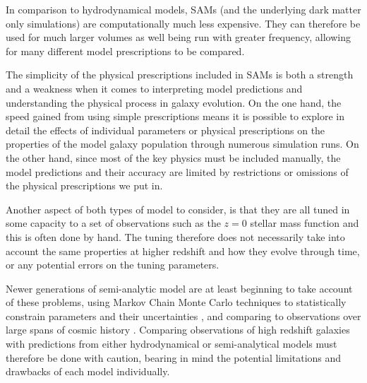 \begin{itemize}
		In comparison to hydrodynamical models, SAMs (and the underlying dark matter only simulations) are computationally much less expensive. They can therefore be used for much larger volumes as well being run with greater frequency, allowing for many different model prescriptions to be compared.
		
		The simplicity of the physical prescriptions included in SAMs is both a strength and a weakness when it comes to interpreting model predictions and understanding the physical process in galaxy evolution. On the one hand, the speed gained from using simple prescriptions means it is possible to explore in detail the effects of individual parameters or physical prescriptions on the properties of the model galaxy population through numerous simulation runs. On the other hand, since most of the key physics must be included manually, the model predictions and their accuracy are limited by restrictions or omissions of the physical prescriptions we put in.
\end{itemize}

Another aspect of both types of model to consider, is that they  are all tuned in some capacity to a set of observations such as the $z = 0$ stellar mass function and this is often done by hand. The tuning therefore does not necessarily take into account the same properties at higher redshift and how they evolve through time, or any potential errors on the tuning parameters. 

Newer generations of semi-analytic model are at least beginning to take account of these problems, using Markov Chain Monte Carlo techniques to statistically constrain parameters and their uncertainties \citep{Lu:2011hj,Henriques:2013jk}, and comparing to observations over large spans of cosmic history \citep{Henriques:2013jk}. Comparing observations of high redshift galaxies with predictions from either hydrodynamical or semi-analytical models must therefore be done with caution, bearing in mind the potential limitations and drawbacks of each model individually.


